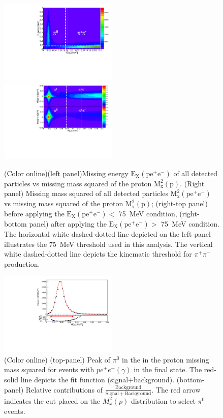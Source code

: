 \documentclass[aps,prc,twocolumn,floatfix,showpacs,preprintnumbers,amsmath,amssymb,superscriptaddress,linenumbers]{revtex4-1}
\def\pizT{$\pi^{0} \ $}
\begin{document}
\begin{figure}[htb]%
	\centerline{
		\includegraphics[height=0.35\textwidth,width=0.5\textwidth]{ME_vs_mxpcompare.pdf}\hfill
		\includegraphics[height=0.35\textwidth,width=0.5\textwidth]{mm2_vs_mxp_compare.pdf}}
	
	\caption{(Color online)(left panel)Missing energy $\mathrm{E_X(pe^+e^-)}$ of all detected particles vs missing mass squared of the proton $  \mathrm{M_x^2(p)}$. (Right panel) Missing mass squared of all detected particles $\mathrm{M_x^2(pe^+e^-)}$ vs 
		missing mass squared of the proton $\mathrm{M_x^2(p)}$; (right-top panel) before applying the
		$\mathrm{E_X(pe^+e^-)} <$ 75~MeV condition, (right-bottom panel)
		after applying the $\mathrm{E_X(pe^+e^-)} >$ 75~MeV condition.
		The horizontal white dashed-dotted line depicted on the left
		panel illustrates the 75~MeV threshold used in this analysis.
		The vertical white dashed-dotted line depicts the kinematic
		threshold for $\pi^+\pi^-$ production.}
	\label{fig:sys}
\end{figure}
\begin{figure}[!htb]
	\centerline{
		\includegraphics[height=0.35\textwidth,width=0.5\textwidth]{G12_Pi0_wBck.pdf}}
	
	\caption {(Color online) (top-panel) Peak of $\pi^0$ in the in the proton missing mass squared for events 
		with $pe^+e^-(\gamma)$ in the final state.
		The red-solid line depicts the fit function (signal+background).
		(bottom-panel) Relative contributions of $\frac{\mathrm{Background}}
		{\mathrm{Signal + Background}}$. The red arrow indicates the cut
		placed on the $M_x^2(p)$ distribution to select \pizT events.}
	\label{fig:pi0_peak}
\end{figure}
\end{document}
